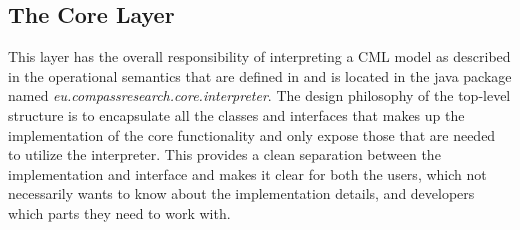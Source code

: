 \documentclass[a4paper, 10pt]{include/compassreport}   %
\begin{document}
\subsection{The Core Layer}
This layer has the overall responsibility of interpreting a CML model
as described in the operational semantics that are defined in
\cite{D23.4} and is located in the java package named
\emph{eu.compassresearch.core.interpreter}. The design philosophy of
the top-level structure is to encapsulate all the classes and
interfaces that makes up the implementation of the core functionality
and only expose those that are needed to utilize the interpreter. This
provides a clean separation between the implementation and interface
and makes it clear for both the users, which not necessarily wants to
know about the implementation details, and developers which parts they
need to work with.
\end{document}
